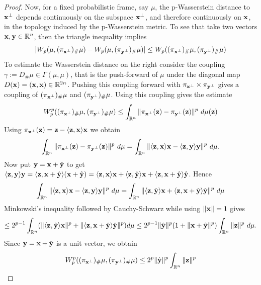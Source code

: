 \documentclass{amsart}
\numberwithin{equation}{section}
\newcommand\R{{\mathbb R}}
\theoremstyle{plain}
\theoremstyle{definition}
\begin{document}
\begin{proof}
Now, for a fixed probabilistic frame, say $\mu$, the p-Wasserstein distance to ${\bf x}^{\perp}$ depends continuously on the subspace ${\bf x}^{\perp}$, and therefore continuously on ${\bf x}$, in the topology induced by the p-Wasserstein metric. To see that take two vectors ${\bf x}, {\bf y} \in \R^n$, then the triangle inequality implies 
$$ | W_p(\mu, (\pi_{{\bf x}^{\perp}})_{\#}\mu)-  W_p(\mu, (\pi_{{\bf y}^{\perp}})_{\#} \mu)| \leq W_p((\pi_{{\bf x}^{\perp}})_{\#}\mu, (\pi_{{\bf y}^{\perp}})_{\#}\mu)
$$  
To estimate the Wasserstein distance on the right consider the coupling $\gamma:=D_{\#}\mu \in \Gamma(\mu, \mu)$, that is the push-forward of $\mu$ under the diagonal map $D({\bf x})=({\bf x},{\bf x}) \in \R^{2n}$.  Pushing this coupling forward with $\pi_{{\bf x}^{\perp}} \times \pi_{{\bf y}^{\perp}}$ gives a coupling 
of $(\pi_{{\bf x}^{\perp}})_{\#} \mu$ and $(\pi_{{\bf y}^{\perp}})_{\#} \mu$. Using this coupling gives the estimate 
\[W^p_p((\pi_{{\bf x}^{\perp}})_{\#}\mu, (\pi_{{\bf y}^{\perp}})_{\#}\mu) \leq \int_{\R^n} \| \pi_{{\bf x}^{\perp}}({\bf z}) -  \pi_{{\bf y}^{\perp}}({\bf z}) \|^p \ d\mu({\bf z})
\]
Using $\pi_{{\bf x}^{\perp}}({\bf z})={\bf z}-\langle{\bf z}, {\bf x} \rangle {\bf x}$ we obtain 
\[\int_{\R^n} \| \pi_{{\bf x}^{\perp}}({\bf z}) -  \pi_{{\bf y}^{\perp}}({\bf z}) \|^p \ d\mu=
\int_{\R^n} \| \langle{\bf z}, {\bf x} \rangle {\bf x}-\langle{\bf z}, {\bf y} \rangle {\bf y}    \|^p \ d\mu.
\]
Now put ${\bf y} = {\bf x} + \hat{ {\bf y}}$ to get $\langle{\bf z}, {\bf y} \rangle {\bf y} =\langle{\bf z}, {\bf x} + \hat{ {\bf y}} 
\rangle ({\bf x} + \hat{ {\bf y}}) = \langle{\bf z}, {\bf x} \rangle {\bf x} + \langle{\bf z}, \hat{ {\bf y}} 
\rangle {\bf x} + \langle{\bf z}, {\bf x} + \hat{ {\bf y}} \rangle \hat{{\bf y}}$. Hence 
\[
\int_{\R^n} \| \langle{\bf z}, {\bf x} \rangle {\bf x}-\langle{\bf z}, {\bf y} \rangle {\bf y}    \|^p \ d\mu
=\int_{\R^n} \|  \langle{\bf z}, \hat{ {\bf y}} \rangle {\bf x} + \langle{\bf z}, {\bf x} + \hat{ {\bf y}} \rangle \hat{{\bf y}}  \|^p \ d\mu\]
Minkowski's inequality followed by Cauchy-Schwarz while using $\|{\bf x}\|=1$ gives 
\[\leq 2^{p-1} \int_{\R^n} (\|  \langle{\bf z}, \hat{ {\bf y}} \rangle {\bf x} \|^p +\| \langle{\bf z}, {\bf x} + \hat{ {\bf y}} \rangle \hat{{\bf y}}  \|^p)  d\mu \leq 2^{p-1}  \|\hat{ {\bf y}}\|^p (1 +  \|{\bf x} + \hat{ {\bf y}}\|^p) 
\int_{\R^n} \|{\bf z}\|^p  \ d\mu.
\]
Since ${\bf y}= {\bf x}+ \hat{ {\bf y}}$ is a unit vector, we obtain 
\[
W^p_p((\pi_{{\bf x}^{\perp}})_{\#}\mu, (\pi_{{\bf y}^{\perp}})_{\#}\mu) \leq 2^p \|\hat{ {\bf y}}\|^p \int_{\R^n} \|{\bf z}\|^p  
\]
\end{proof}
\end{document}
